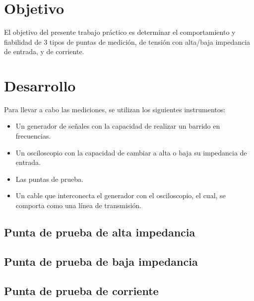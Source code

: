 \documentclass[a4paper,10pt]{article}
\title{  }
\begin{document}
	\maketitle %
	\newpage

	\tableofcontents %
	\newpage


	\section{Objetivo}
	
	\indent	El objetivo del presente trabajo práctico es determinar el comportamiento y fiabilidad de 3 tipos de puntas de medición, de tensión con alta/baja impedancia de entrada, y de corriente.
	
	\newpage
	\section{Desarrollo}
		\indent Para llevar a cabo las mediciones, se utilizan los siguientes instrumentos:
		\begin{itemize}
			\item Un generador de señales con la capacidad de realizar un barrido en frecuencias.
			\item Un osciloscopio con la capacidad de cambiar a alta o baja su impedancia de entrada.
			\item Las puntas de prueba.
			\item Un cable que interconecta el generador con el osciloscopio, el cual, se comporta como una línea de transmisión.
		\end{itemize}
				 
		\subsection{Punta de prueba de alta impedancia}
		\subsection{Punta de prueba de baja impedancia}
		\subsection{Punta de prueba de corriente}
		
		
\end{document}
